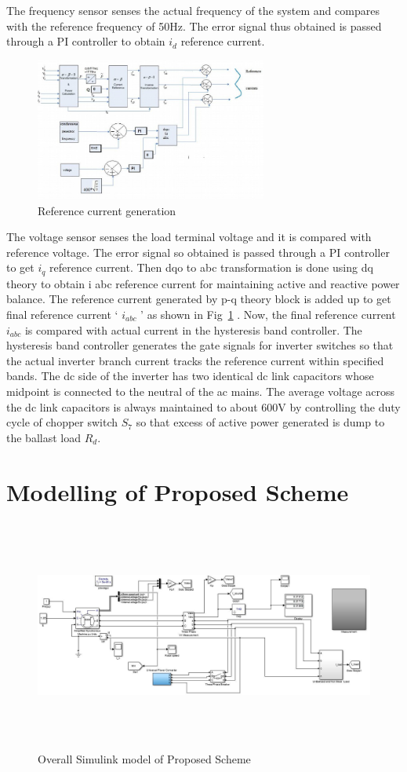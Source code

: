 \documentclass[journal,twoside]{IEEEtran}
\begin{document}
\bigskip
The frequency sensor senses the actual frequency of the
system and compares with the reference frequency of 50Hz.
The error signal thus obtained is passed through a PI controller
to obtain $i_d$ reference current. 
\begin{figure}[!ht]
\centering
\includegraphics[width=3in]{5}
\caption{Reference current generation}
\label{f5}
\end{figure}
The voltage sensor senses the
load terminal voltage and it is compared with reference
voltage. The error signal so obtained is passed through a PI
controller to get $i_q$ reference current. Then dqo to abc
transformation is done using dq theory to obtain i abc reference
current for maintaining active and reactive power balance. The
reference current generated by p-q theory block is added up to
get final reference current ‘ $i_{abc}$ ’ as shown in Fig~\ref{f5} . Now, the
final reference current $i_{abc}$ is compared with actual current in
the hysteresis band controller. The hysteresis band controller
generates the gate signals for inverter switches so that the
actual inverter branch current tracks the reference current
within specified bands. The dc side of the inverter has two
identical dc link capacitors whose midpoint is connected to the
neutral of the ac mains. The average voltage across the dc link
capacitors is always maintained to about 600V by controlling
the duty cycle of chopper switch $S_7$ so that excess of active
power generated is dump to the ballast load $R_d$.
	


\section{Modelling of Proposed Scheme}


\begin{figure}[!ht]
\centering
\includegraphics[height=3in,width=6in, angle =90]{6}
\caption{Overall Simulink model of Proposed Scheme}
\label{f6}
\end{figure}
\end{document}
